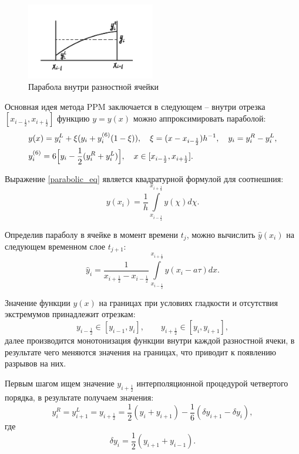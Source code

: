 \documentclass[12pt,a4paper]{article}
\newcommand{\half}{\frac{1}{2}}
\newcommand{\dhalf}{\dfrac{1}{2}}
\begin{document}
    \begin{figure}[h]
        \centering
        \includegraphics[width=0.5\textwidth]{ppm_visual.jpeg}
        \caption{Парабола внутри разностной ячейки}
        \label{fig:ppm_visual}
    \end{figure}

    Основная идея метода PPM заключается в следующем -- внутри отрезка $ [x_{i-\half}, x_{i+\half}] $ функцию $ y = y(x) $ можно аппроксимировать параболой:
    \begin{equation}
    \begin{split}
        \label{parabolic_eq}
        &y(x) = y_i^L + \xi(\Delta y_i + y_i^{(6)}(1 - \xi)), \quad \xi = (x - x_{i-\half})h^{-1}, \quad  \Delta y_i = y_i^R-y_i^L, \\
        &y_i^{(6)} = 6\Bigl[ y_i - \half(y_i^R + y_i^L)\Bigr], \quad x \in [x_{i-\half}, x_{i + \half}].
    \end{split}
    \end{equation}

    Выражение \eqref{parabolic_eq} является квадратурной формулой для соотнешния:
    \[
        y(x_i) = \dfrac{1}{h} \displaystyle \int\limits_{x_{i-\half}}^{x_{i+\half}} y(\chi) d\chi.
    \]

    Определив параболу в ячейке в момент времени $ t_j $, можно вычислить $ \hat y(x_i) $ на следующем временном слое $ t_{j+1} $: 
    \[
        \hat y_i = \dfrac{1}{x_{i+\half}-x_{i-\half}} \int\limits_{x_{i-\half}}^{x_{i+\half}} y(x_i-a \tau) dx.
    \]

   Значение функции $ y(x) $ на границах при условиях гладкости и отсутствия экстремумов принадлежит отрезкам:
   \begin{equation}
        \label{ppm_boundary}
        y_{i-\half} \in [y_{i-1}, y_i], \qquad y_{i+\half} \in [y_i, y_{i+1}], 
   \end{equation}
   \noindent далее производится монотонизация функции внутри каждой разностной ячеки, в результате чего меняются значения на границах, что приводит к появлению разрывов на них.

   Первым шагом ищем значение $y_{i+\half}$ интерполяционной процедурой четвертого порядка, в результате получаем значения:
   \[
        y_i^R = y_{i+1}^L = y_{i+\half} = \dhalf(y_i + y_{i+1}) - \dfrac{1}{6}(\delta y_{i+1} - \delta y_i),
   \] 
   \noindent где 
   \[
        \delta y_i = \dhalf(y_{i+1} + y_{i-1}).
   \]
\end{document}
